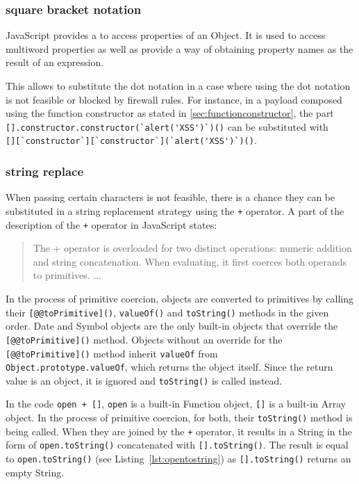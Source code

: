 \subsubsection{square bracket notation}
JavaScript provides a  to access properties of an Object. It is used to access multiword properties as well as provide a way of obtaining property names as the result of an expression. \cite{js/brackets}

This  allows to substitute the dot notation in a case where using the dot notation is not feasible or blocked by firewall rules.
For instance, in a payload composed using the function constructor as stated in \ref{sec:functionconstructor}, the part \\ \verb|[].constructor.constructor(`alert('XSS')`)()| can be substituted with \\ \verb|[][`constructor`][`constructor`](`alert('XSS')`)()|.


\subsubsection{string replace}
\label{sec:stringreplace}
When passing certain characters is not feasible, there is a chance they can be substituted in a string replacement strategy using the \verb|+| operator.
A part of the description of the \verb|+| operator in JavaScript states:
\begin{quote}
	The + operator is overloaded for two distinct operations: numeric addition and string concatenation. When evaluating, it first coerces both operands to primitives. ... \cite{js/+}
\end{quote}
In the process of primitive coercion, objects are converted to primitives by calling their \verb|[@@toPrimitive]()|, \verb|valueOf()| and \verb|toString()| methods in the given order. Date and Symbol objects are the only built-in objects that override the \verb|[@@toPrimitive]()| method.
Objects without an override for the \verb|[@@toPrimitive]()| method inherit \verb|valueOf| from
\\ \verb|Object.prototype.valueOf|, which returns the object itself.
Since the return value is an object, it is ignored and \verb|toString()| is called instead. \cite{js/primitiveCoercion}

In the code \verb|open + []|, \verb|open| is a built-in Function object, \verb|[]| is a built-in Array object.
In the process of primitive coercion, for both, their \verb|toString()| method is being called.
When they are joined by the \verb|+| operator, it results in a String in the form of \verb|open.toString()| concatenated with \verb|[].toString()|. The result is equal to \verb|open.toString()| (see Listing~\ref{lst:opentostring}) as \verb|[].toString()| returns an empty String.

